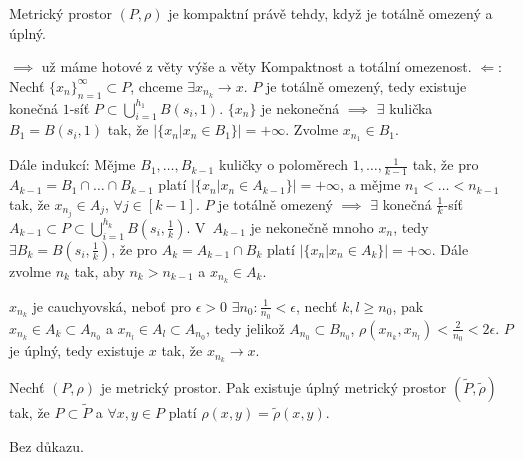 \documentclass[12pt]{article}					%
\begin{document}
		\begin{veta}
			Metrický prostor $(P, \rho)$ je kompaktní právě tehdy, když je totálně omezený a úplný.

			\begin{dukazin}
				$\implies$ už máme hotové z věty výše a věty Kompaktnost a totální omezenost. $\Leftarrow$: Nechť $\{x_n\}_{n=1}^∞ \subset P$, chceme $\exists x_{n_k} \rightarrow x$. $P$ je totálně omezený, tedy existuje konečná $1$-síť $P \subset \bigcup_{i=1}^{h_1} B(s_i, 1)$. $\{x_n\}$ je nekonečná $\implies$ $\exists$ kulička $B_1 = B(s_i, 1)$ tak, že $|\{x_n | x_n \in B_1\}| = +∞$. Zvolme $x_{n_1} \in B_1$.

				Dále indukcí: Mějme $B_1, …, B_{k-1}$ kuličky o poloměrech $1, …, \frac{1}{k-1}$ tak, že pro $A_{k-1} = B_1 \cap … \cap B_{k-1}$ platí $|\{x_n | x_n \in A_{k-1}\}| = +∞$, a mějme $n_1 < … < n_{k-1}$ tak, že $x_{n_j} \in A_j$, $\forall j \in [k-1]$. $P$ je totálně omezený $\implies$ $\exists$ konečná $\frac{1}{k}$-síť $A_{k-1} \subset P \subset \bigcup_{i=1}^{h_k} B(s_i, \frac{1}{k})$. V $A_{k-1}$ je nekonečně mnoho $x_n$, tedy $\exists B_k = B(s_i, \frac{1}{k})$, že pro $A_k = A_{k-1} \cap B_k$ platí $|\{x_n | x_n \in A_k\}| = +∞$. Dále zvolme $n_k$ tak, aby $n_k > n_{k-1}$ a $x_{n_k} \in A_k$.

				$x_{n_k}$ je cauchyovská, neboť pro $\epsilon > 0$ $\exists n_0: \frac{1}{n_0} < \epsilon$, nechť $k, l ≥ n_0$, pak $x_{n_k} \in A_k \subset A_{n_0}$ a $x_{n_l} \in A_l \subset A_{n_0}$, tedy jelikož $A_{n_0} \subset B_{n_0}$, $\rho(x_{n_k}, x_{n_l}) < \frac{2}{n_0} < 2\epsilon$. $P$ je úplný, tedy existuje $x$ tak, že $x_{n_k} \rightarrow x$.
			\end{dukazin}
		\end{veta}

		\begin{veta}
			Nechť $(P, \rho)$ je metrický prostor. Pak existuje úplný metrický prostor $(\tilde P, \tilde \rho)$ tak, že $P \subset \tilde P$ a $\forall x, y \in P$ platí $\rho(x, y) = \tilde \rho(x, y)$.

			\begin{dukazin}
				Bez důkazu.
			\end{dukazin}
		\end{veta}
\end{document}

